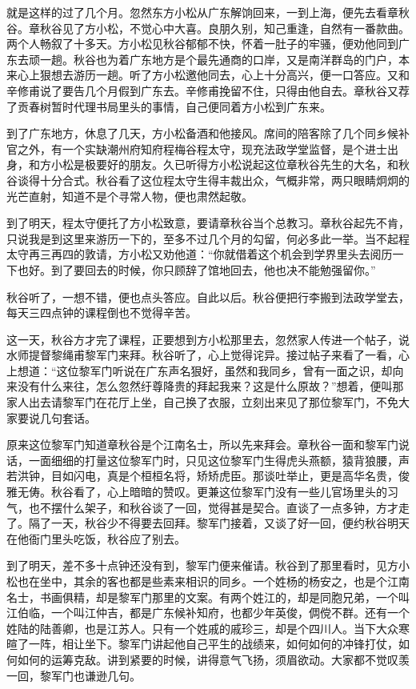 \documentclass[12pt,UTF8]{ctexbook}
\begin{document}
{{{就是这样的过了几个月。忽然东方小松从广东解饷回来，一到上海，便先去看章秋谷。章秋谷见了方小松，不觉心中大喜。良朋久别，知己重逢，自然有一番款曲。两个人畅叙了十多天。方小松见秋谷郁郁不快，怀着一肚子的牢骚，便劝他同到广东去顽一趟。秋谷也为着广东地方是个最先通商的口岸，又是南洋群岛的门户，本来心上狠想去游历一趟。听了方小松邀他同去，心上十分高兴，便一口答应。又和辛修甫说了要告几个月假到广东去。辛修甫挽留不住，只得由他自去。章秋谷又荐了贡春树暂时代理书局里头的事情，自己便同着方小松到广东来。

到了广东地方，休息了几天，方小松备酒和他接风。席间的陪客除了几个同乡候补官之外，有一个实缺潮州府知府程梅谷程太守，现充法政学堂监督，是个进士出身，和方小松是极要好的朋友。久已听得方小松说起这位章秋谷先生的大名，和秋谷谈得十分合式。秋谷看了这位程太守生得丰裁出众，气概非常，两只眼睛炯炯的光芒直射，知道不是个寻常人物，便也肃然起敬。

到了明天，程太守便托了方小松致意，要请章秋谷当个总教习。章秋谷起先不肯，只说我是到这里来游历一下的，至多不过几个月的勾留，何必多此一举。当不起程太守再三再四的敦请，方小松又劝他道：“你就借着这个机会到学界里头去阅历一下也好。到了要回去的时候，你只顾辞了馆地回去，他也决不能勉强留你。”

秋谷听了，一想不错，便也点头答应。自此以后。秋谷便把行李搬到法政学堂去，每天三四点钟的课程倒也不觉得辛苦。

这一天，秋谷方才完了课程，正要想到方小松那里去，忽然家人传进一个帖子，说水师提督黎绳甫黎军门来拜。秋谷听了，心上觉得诧异。接过帖子来看了一看，心上想道：“这位黎军门听说在广东声名狠好，虽然和我同乡，曾有一面之识，却向来没有什么来往，怎么忽然纡尊降贵的拜起我来？这是什么原故？”想着，便叫那家人出去请黎军门在花厅上坐，自己换了衣服，立刻出来见了那位黎军门，不免大家要说几句套话。

原来这位黎军门知道章秋谷是个江南名士，所以先来拜会。章秋谷一面和黎军门说话，一面细细的打量这位黎军门时，只见这位黎军门生得虎头燕额，猿背狼腰，声若洪钟，目如闪电，真是个桓桓名将，矫矫虎臣。那谈吐举止，更是高华名贵，俊雅无俦。秋谷看了，心上暗暗的赞叹。更兼这位黎军门没有一些儿官场里头的习气，也不摆什么架子，和秋谷谈了一回，觉得甚是契合。直谈了一点多钟，方才走了。隔了一天，秋谷少不得要去回拜。黎军门接着，又谈了好一回，便约秋谷明天在他衙门里头吃饭，秋谷应了别去。

到了明天，差不多十点钟还没有到，黎军门便来催请。秋谷到了那里看时，见方小松也在坐中，其余的客也都是些素来相识的同乡。一个姓杨的杨安之，也是个江南名士，书画俱精，却是黎军门那里的文案。有两个姓江的，却是同胞兄弟，一个叫江伯临，一个叫江仲吉，都是广东候补知府，也都少年英俊，倜傥不群。还有一个姓陆的陆善卿，也是江苏人。只有一个姓戚的戚珍三，却是个四川人。当下大众寒暄了一阵，相让坐下。黎军门讲起他自己平生的战绩来，如何如何的冲锋打仗，如何如何的运筹克敌。讲到紧要的时候，讲得意气飞扬，须眉欲动。大家都不觉叹羡一回，黎军门也谦逊几句。

}}}
\end{document}
